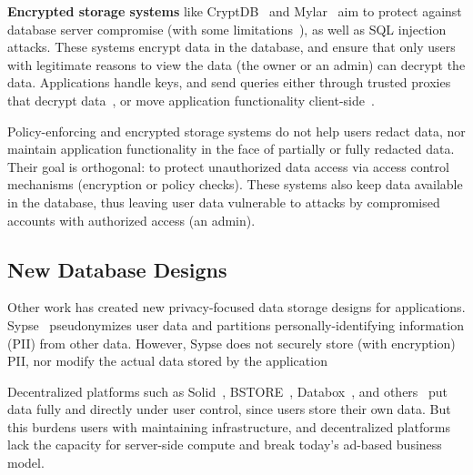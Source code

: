 \textbf{Encrypted storage systems} like
CryptDB~\cite{cryptdb} and
Mylar~\cite{mylar} aim to protect against database server compromise (with some
limitations~\cite{grubbs}), as well as SQL injection attacks.
%
These systems encrypt data in the database, and ensure that only
users with legitimate reasons to view the data (\ie the owner or an
admin) can decrypt the data.
%
Applications handle keys, and send queries either through
trusted proxies that decrypt data~\cite{cryptdb}, or move application
functionality client-side~\cite{mylar}.
%

Policy-enforcing and encrypted storage systems do not help users redact data,
nor maintain application functionality in the face of partially or fully
redacted data. 
%
Their goal is orthogonal: to protect unauthorized data access via access control
mechanisms (encryption or policy checks).
%
These systems also keep data available in the database, thus leaving user data
vulnerable to attacks by compromised accounts with authorized access (\eg an
admin).

%
\subsection{New Database Designs}
Other work has created new privacy-focused data storage designs for applications.
Sypse~\cite{sypse} pseudonymizes user data and partitions personally-identifying
information (PII) from other data.
%
%
However, Sypse does not securely store (\eg with encryption) PII, nor modify the
actual data stored by the application

%
Decentralized platforms such as Solid~\cite{solid}, BSTORE~\cite{bstore},
Databox~\cite{databox}, and others~\cite{diy, amber, oort, w5, blockstack} put
data fully and directly under user control, since users store their own data.
%
But this burdens users with maintaining infrastructure, and decentralized platforms
lack the capacity for server-side compute and break today's ad-based
business model.
%
%


